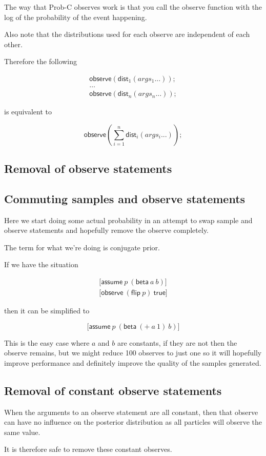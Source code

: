\documentclass[a4paper]{article}
\begin{document}
The way that Prob-C observes work is that you call the observe function with the log of the probability of the event happening.

Also note that the distributions used for each observe are independent of each other.

Therefore the following

\[
	\begin{array}{l}
		\mathsf{observe}(\mathsf{dist}_1(args_1 ...)); \\
		\dots \\
		\mathsf{observe}(\mathsf{dist}_n(args_n ...));
	\end{array}
\]

is equivalent to

\[\mathsf{observe}(\sum_{i=1}^n\mathsf{dist}_i(args_i ...));\]



\subsection{Removal of observe statements}

\subsection{Commuting samples and observe statements}

Here we start doing some actual probability in an attempt to swap sample and observe statements and hopefully remove the observe completely.

The term for what we're doing is conjugate prior.

If we have the situation

\[
	\begin{array}{l}
		\lbrack \mathsf{assume}\ p\ (\mathsf{beta}\ a\ b) \rbrack \\
		\lbrack \mathsf{observe}\ (\mathsf{flip}\ p)\ \mathsf{true} \rbrack
	\end{array}
\]

then it can be simplified to

\[\lbrack \mathsf{assume}\ p\ (\mathsf{beta}\ (+\ a\ 1)\ b) \rbrack\]

This is the easy case where \(a\) and \(b\) are constants, if they are not then the observe remains, but we might reduce 100 observes to just one so it will hopefully improve performance and definitely improve the quality of the samples generated.



\subsection{Removal of constant observe statements}

When the arguments to an observe statement are all constant, then that observe can have no influence on the posterior distribution as all particles will observe the same value.

It is therefore safe to remove these constant observes.
\end{document}
